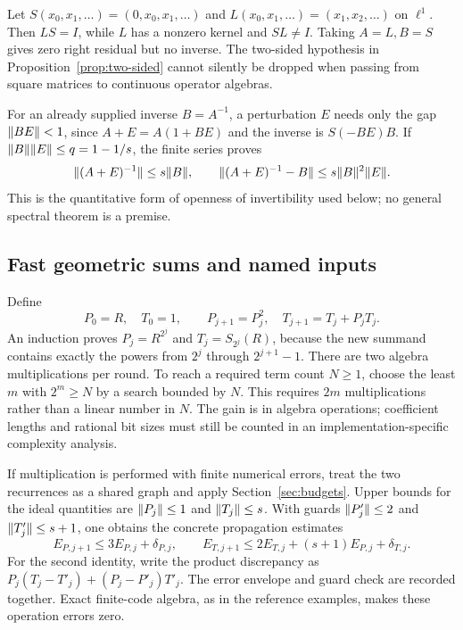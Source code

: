 \begin{remark}
Let $S(x_0,x_1,\ldots)=(0,x_0,x_1,\ldots)$ and $L(x_0,x_1,\ldots)=(x_1,x_2,\ldots)$ on $\ell^1$. Then $LS=I$, while $L$ has a nonzero kernel and $SL\ne I$. Taking $A=L,B=S$ gives zero right residual but no inverse. The two-sided hypothesis in Proposition~\ref{prop:two-sided} cannot silently be dropped when passing from square matrices to continuous operator algebras.
\end{remark}

For an already supplied inverse $B=A^{-1}$, a perturbation $E$ needs only the gap $\lVert BE\rVert<1$, since
$A+E=A(1+BE)$ and the inverse is $S(-BE)B$. If $\lVert B\rVert\lVert E\rVert\le q=1-1/s$, the finite series proves
\[
 \lVert (A+E)^{-1}\rVert\le s\lVert B\rVert,\qquad
 \lVert (A+E)^{-1}-B\rVert\le s\lVert B\rVert^2\lVert E\rVert.
\]
This is the quantitative form of openness of invertibility used below; no general spectral theorem is a premise.

\subsection{Fast geometric sums and named inputs}

Define
\begin{equation}\label{eq:doubling}
 P_0=R,\quad T_0=1,\qquad
 P_{j+1}=P_j^2,\quad T_{j+1}=T_j+P_jT_j.
\end{equation}
An induction proves
$P_j=R^{2^j}$ and $T_j=S_{2^j}(R)$, because the new summand contains exactly the powers from $2^j$ through $2^{j+1}-1$. There are two algebra multiplications per round. To reach a required term count $N\ge1$, choose the least $m$ with $2^m\ge N$ by a search bounded by $N$. This requires $2m$ multiplications rather than a linear number in $N$. The gain is in algebra operations; coefficient lengths and rational bit sizes must still be counted in an implementation-specific complexity analysis.

If multiplication is performed with finite numerical errors, treat the two recurrences as a shared graph and apply Section~\ref{sec:budgets}. Upper bounds for the ideal quantities are $\lVert P_j\rVert\le1$ and $\lVert T_j\rVert\le s$. With guards $\lVert P'_j\rVert\le2$ and $\lVert T'_j\rVert\le s+1$, one obtains the concrete propagation estimates
\[
 E_{P,j+1}\le3E_{P,j}+\delta_{P,j},\qquad
 E_{T,j+1}\le2E_{T,j}+(s+1)E_{P,j}+\delta_{T,j}.
\]
For the second identity, write the product discrepancy as
$P_j(T_j-T'_j)+(P_j-P'_j)T'_j$.
The error envelope and guard check are recorded together. Exact finite-code algebra, as in the reference examples, makes these operation errors zero.


